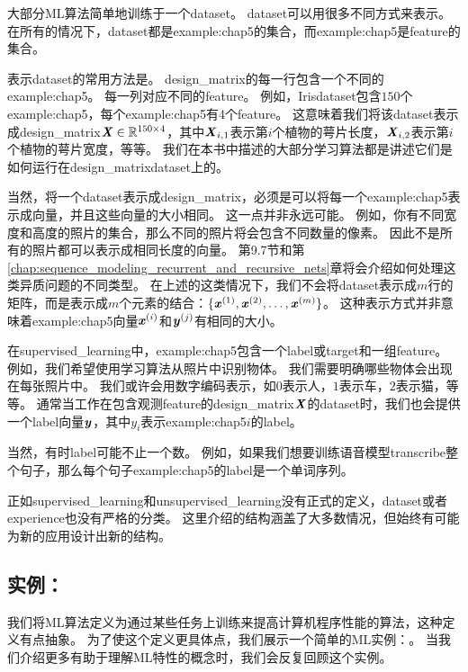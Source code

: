 大部分\gls{ML}算法简单地训练于一个\gls{dataset}。
\gls{dataset}可以用很多不同方式来表示。
在所有的情况下，\gls{dataset}都是\gls{example:chap5}的集合，而\gls{example:chap5}是\gls{feature}的集合。

表示\gls{dataset}的常用方法是。
\gls{design_matrix}的每一行包含一个不同的\gls{example:chap5}。
每一列对应不同的\gls{feature}。
例如，Iris\gls{dataset}包含$150$个\gls{example:chap5}，每个\gls{example:chap5}有4个\gls{feature}。
这意味着我们将该\gls{dataset}表示成\gls{design_matrix}$\boldsymbol{\mathit{X}}\in\mathbb{R}^{150\times 4}$，其中$\boldsymbol{\mathit{X}}_{i,1}$表示第$i$个植物的萼片长度，$\boldsymbol{\mathit{X}}_{i,2}$表示第$i$个植物的萼片宽度，等等。
我们在本书中描述的大部分学习算法都是讲述它们是如何运行在\gls{design_matrix}\gls{dataset}上的。

当然，将一个\gls{dataset}表示成\gls{design_matrix}，必须是可以将每一个\gls{example:chap5}表示成向量，并且这些向量的大小相同。
这一点并非永远可能。
例如，你有不同宽度和高度的照片的集合，那么不同的照片将会包含不同数量的像素。
因此不是所有的照片都可以表示成相同长度的向量。
第9.7节和第\ref{chap:sequence_modeling_recurrent_and_recursive_nets}章将会介绍如何处理这类异质问题的不同类型。
在上述的这类情况下，我们不会将\gls{dataset}表示成$m$行的矩阵，而是表示成$m$个元素的结合：$\{\boldsymbol{\mathit{x}}^{(1)},\boldsymbol{\mathit{x}}^{(2)},\dots,\boldsymbol{\mathit{x}}^{(m)}\}$。
这种表示方式并非意味着\gls{example:chap5}向量$\boldsymbol{\mathit{x}}^{(i)}$和$\boldsymbol{\mathit{y}}^{(j)}$有相同的大小。


在\gls{supervised_learning}中，\gls{example:chap5}包含一个\gls{label}或\gls{target}和一组\gls{feature}。
例如，我们希望使用学习算法从照片中识别物体。
我们需要明确哪些物体会出现在每张照片中。
我们或许会用数字编码表示，如$0$表示人，$1$表示车，$2$表示猫，等等。
通常当工作在包含观测\gls{feature}的\gls{design_matrix}$\boldsymbol{\mathit{X}}$的\gls{dataset}时，我们也会提供一个\gls{label}向量$\boldsymbol{\mathit{y}}$，其中$y_i$表示\gls{example:chap5}$i$的\gls{label}。

当然，有时\gls{label}可能不止一个数。
例如，如果我们想要训练语音模型\gls{transcribe}整个句子，那么每个句子\gls{example:chap5}的\gls{label}是一个单词序列。

正如\gls{supervised_learning}和\gls{unsupervised_learning}没有正式的定义，\gls{dataset}或者\gls{experience}也没有严格的分类。
这里介绍的结构涵盖了大多数情况，但始终有可能为新的应用设计出新的结构。

\subsection{实例：}
\label{sec:example_linear_regression}
我们将\gls{ML}算法定义为通过某些任务上训练来提高计算机程序性能的算法，这种定义有点抽象。
为了使这个定义更具体点，我们展示一个简单的\gls{ML}实例：。
当我们介绍更多有助于理解\gls{ML}特性的概念时，我们会反复回顾这个实例。

